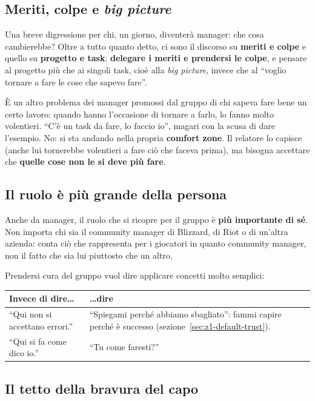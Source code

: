 \subsection{Meriti, colpe e \emph{big picture}}

Una breve digressione per chi, un giorno, diventerà manager: che cosa cambierebbe? Oltre a tutto
quanto detto, ci sono il discorso su \textbf{meriti e colpe} e quello su \textbf{progetto e task}:
\textbf{delegare i meriti e prendersi le colpe}, e pensare al progetto più che ai singoli task, cioè
alla \emph{big picture}, invece che al ``voglio tornare a fare le cose che sapevo fare''.

È un altro problema dei manager promossi dal gruppo di chi sapeva fare bene un certo lavoro: quando
hanno l'occasione di tornare a farlo, lo fanno molto volentieri. ``C'è un task da fare, lo faccio io'',
magari con la scusa di dare l'esempio. No: si sta andando nella propria \textbf{comfort zone}. Il
relatore lo capisce (anche lui tornerebbe volentieri a fare ciò che faceva prima), ma bisogna accettare
che \textbf{quelle cose non le si deve più fare}.

\subsection{Il ruolo è più grande della persona}

Anche da manager, il ruolo che si ricopre per il gruppo è \textbf{più importante di sé}. Non importa
chi sia il community manager di Blizzard, di Riot o di un'altra azienda: conta ciò che rappresenta per i
giocatori in quanto community manager, non il fatto che sia lui piuttosto che un altro.

Prendersi cura del gruppo vuol dire applicare concetti molto semplici:
\begin{center}
  \begin{tabular}{@{}p{}p{}@{}}
    \toprule
    \textbf{Invece di dire\dots} & \textbf{\dots dire} \\
    \midrule
    ``Qui non si accettano errori.'' &
      ``Spiegami perché abbiamo sbagliato'': fammi capire perché è successo
      (sezione~\ref{sec:z1-default-trust}). \\
    \addlinespace
    ``Qui si fa come dico io.'' & ``Tu come faresti?'' \\
    \bottomrule
  \end{tabular}
\end{center}

\subsection{Il tetto della bravura del capo}

